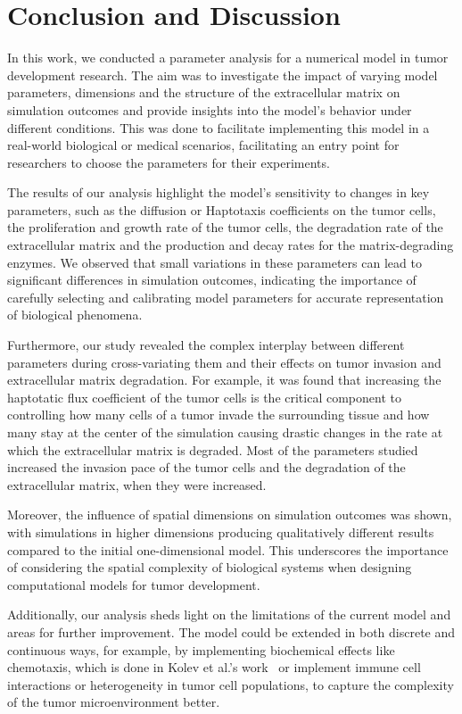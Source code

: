\section{Conclusion and Discussion}
In this work, we conducted a parameter analysis for a numerical model in tumor development research. The aim was to investigate the impact of varying model parameters, dimensions and the structure of the extracellular matrix on simulation outcomes and provide insights into the model's behavior under different conditions. This was done to facilitate implementing this model in a real-world biological or medical scenarios, facilitating an entry point for researchers to choose the parameters for their experiments.

The results of our analysis highlight the model's sensitivity to changes in key parameters, such as the diffusion or Haptotaxis coefficients on the tumor cells, the proliferation and growth rate of the tumor cells, the degradation rate of the extracellular matrix and the production and decay rates for the matrix-degrading enzymes. We observed that small variations in these parameters can lead to significant differences in simulation outcomes, indicating the importance of carefully selecting and calibrating model parameters for accurate representation of biological phenomena.

Furthermore, our study revealed the complex interplay between different parameters during cross-variating them and their effects on tumor invasion and extracellular matrix degradation. For example, it was found that increasing the haptotatic flux coefficient of the tumor cells is the critical component to controlling how many cells of a tumor invade the surrounding tissue and how many stay at the center of the simulation causing drastic changes in the rate at which the extracellular matrix is degraded. Most of the parameters studied increased the invasion pace of the tumor cells and the degradation of the extracellular matrix, when they were increased.

Moreover, the influence of spatial dimensions on simulation outcomes was shown, with simulations in higher dimensions producing qualitatively different results compared to the initial one-dimensional model. This underscores the importance of considering the spatial complexity of biological systems when designing computational models for tumor development.

Additionally, our analysis sheds light on the limitations of the current model and areas for further improvement. The model could be extended in both discrete and continuous ways, for example, by implementing biochemical effects like chemotaxis, which is done in Kolev et al.'s work~\cite{Kolev2010} or implement immune cell interactions or heterogeneity in tumor cell populations, to capture the complexity of the tumor microenvironment better.

